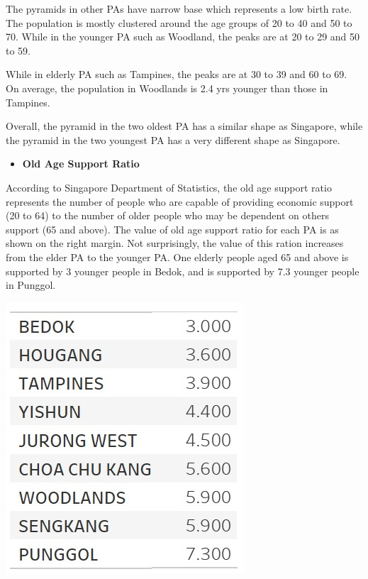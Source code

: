 \documentclass[
  letterpaper,
  DIV=11,
  numbers=noendperiod,
  oneside]{scrartcl}
\providecommand{\tightlist}{%
  \setlength{\itemsep}{0pt}\setlength{\parskip}{0pt}}\usepackage{longtable,booktabs,array}
\begin{document}
The pyramids in other PAs have narrow base which represents a low birth
rate. The population is mostly clustered around the age groups of 20 to
40 and 50 to 70. While in the younger PA such as Woodland, the peaks are
at 20 to 29 and 50 to 59.

While in elderly PA such as Tampines, the peaks are at 30 to 39 and 60
to 69. On average, the population in Woodlands is 2.4 yrs younger than
those in Tampines.

Overall, the pyramid in the two oldest PA has a similar shape as
Singapore, while the pyramid in the two youngest PA has a very different
shape as Singapore.

\begin{itemize}
\tightlist
\item
  \textbf{Old Age Support Ratio}
\end{itemize}

According to Singapore Department of Statistics, the old age support
ratio represents the number of people who are capable of providing
economic support (20 to 64) to the number of older people who may be
dependent on others support (65 and above). The value of old age support
ratio for each PA is as shown on the right margin. Not surprisingly, the
value of this ration increases from the elder PA to the younger PA. One
elderly people aged 65 and above is supported by 3 younger people in
Bedok, and is supported by 7.3 younger people in Punggol.

\begin{marginfigure}

{\centering \includegraphics{images/old age support ratio-02.jpg}

}

\end{marginfigure}
\end{document}
